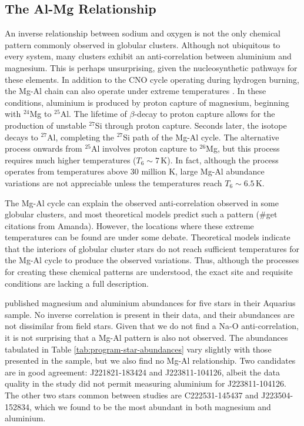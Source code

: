 \documentclass{emulateapj}
\begin{document}
\subsection{The Al-Mg Relationship}


An inverse relationship between sodium and oxygen is not the only chemical pattern commonly observed in globular clusters. Although not ubiquitous to every system, many clusters exhibit an anti-correlation between aluminium and magnesium. This is perhaps unsurprising, given the nucleosynthetic pathways for these elements. In addition to the CNO cycle operating during hydrogen burning, the {Mg-Al} chain can also operate under extreme temperatures \citep[$T_6 \sim 3$\,K;][]{arnould;et-al_1999}. In these conditions, aluminium is produced by proton capture of magnesium, beginning with $^{24}$Mg to $^{25}$Al. The lifetime of $\beta$-decay to proton capture allows for the production of unstable $^{27}$Si through proton capture. Seconds later, the isotope decays to $^{27}$Al, completing the $^{27}$Si path of the Mg-Al cycle. The alternative process onwards from $^{25}$Al involves proton capture to $^{26}$Mg, but this process requires much higher temperatures ($T_6 \sim 7$\,K). In fact, although the process operates from temperatures above 30 million K, large {Mg-Al} abundance variations are not appreciable unless the temperatures reach $T_6 \sim 6.5$\,K. 

The Mg-Al cycle can explain the observed anti-correlation observed in some globular clusters, and most theoretical models predict such a pattern (\#get citations from Amanda). However, the locations where these extreme temperatures can be found are under some debate. Theoretical models indicate that the interiors of globular cluster stars do not reach sufficient temperatures for the {Mg-Al} cycle to produce the observed variations. Thus, although the processes for creating these chemical patterns are understood, the exact site and requisite conditions are lacking a full description.

\citet{wylie-de-boer;et-al_2012} published magnesium and aluminium abundances for five stars in their Aquarius sample. No inverse correlation is present in their data, and their abundances are not dissimilar from field stars. Given that we do not find a {Na-O} anti-correlation, it is not surprising that a {Mg-Al} pattern is also not observed. The abundances tabulated in Table \ref{tab:program-star-abundances} vary slightly with those presented in the \citet{wylie-de-boer;et-al_2012} sample, but we also find no {Mg-Al} relationship. Two candidates are in good agreement: {J221821-183424} and {J223811-104126}, albeit the data quality in the \citet{wylie-de-boer;et-al_2012} study did not permit measuring aluminium for {J223811-104126}. The other two stars common between studies are {C222531-145437} and {J223504-152834}, which we found to be the most abundant in both magnesium and aluminium. 
\end{document}
